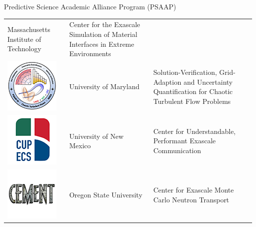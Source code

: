 \documentclass[aspectratio=169]{beamer}
\begin{document}
\begin{frame}{Predictive Science Academic Alliance Program (PSAAP)}
\begin{center}
\begin{tabular}{m{1cm}m{4cm}m{8cm}}
      Massachusetts Institute of Technology& Center for the Exascale Simulation of Material Interfaces in Extreme Environments\\
      \includegraphics[width=.5cm]{./figures/logo_maryland.png}&
      University of Maryland& Solution-Verification, Grid-Adaption and Uncertainty Quantification for Chaotic Turbulent Flow Problems\\
      \includegraphics[width=.5cm]{./figures/logo_unm.png}&
      University of New Mexico& Center for Understandable, Performant Exascale Communication\\
      \includegraphics[width=.5cm]{./figures/logo_osu.png}&
      Oregon State University& Center for Exascale Monte Carlo Neutron Transport
    \end{tabular}
  \end{center}
\end{frame}
\end{document}
